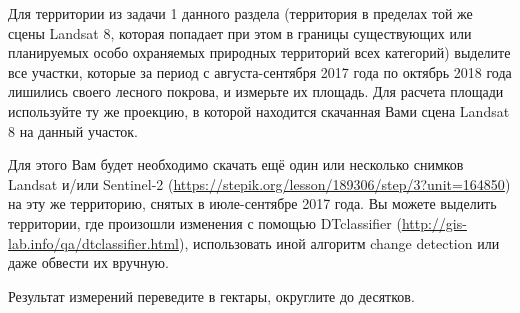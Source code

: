 
Для территории из задачи 1 данного раздела (территория в пределах той же сцены Landsat 8, которая попадает при этом в границы существующих или планируемых особо охраняемых природных территорий всех категорий) выделите все участки, которые за период с августа-сентября 2017 года по октябрь 2018 года лишились своего лесного покрова, и измерьте их площадь. Для расчета площади используйте ту же проекцию, в которой находится скачанная Вами сцена Landsat 8 на данный участок.

Для этого Вам будет необходимо скачать ещё один или несколько снимков Landsat и/или Sentinel-2 (\url{https://stepik.org/lesson/189306/step/3?unit=164850}) на эту же территорию, снятых в июле-сентябре 2017 года. Вы можете выделить территории, где произошли изменения с помощью DTclassifier (\url{http://gis-lab.info/qa/dtclassifier.html}), использовать иной алгоритм change detection или даже обвести их вручную.

Результат измерений переведите в гектары, округлите до десятков.